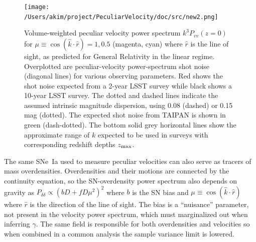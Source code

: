\documentclass[11pt, oneside]{article}   	%
\begin{document}
\begin{figure}[h]
\centering
\texttt{[image: /Users/akim/project/PeculiarVelocity/doc/src/new2.png]}
\caption{Volume-weighted peculiar velocity power spectrum $k^3P_{vv}(z=0)$ for $\mu \equiv \cos{(\hat{k} \cdot \hat{r})}=1, 0.5$ (magenta, cyan) 
where $\hat{r}$ is the line of sight, as predicted for General Relativity in the linear regime.
Overplotted are peculiar-velocity power-spectrum shot noise  (diagonal lines) for various observing parameters.  Red shows the shot noise expected from a 2-year LSST survey
while black shows a 10-year LSST survey.  The dotted and dashed lines indicate the assumed intrinsic magnitude dispersion, using 0.08 (dashed) or 0.15 mag (dotted).  The expected shot
noise from TAIPAN is shown in green (dash-dotted). 
%
The bottom solid grey horizontal lines show the approximate range of $k$ expected to be used in surveys with corresponding
redshift depths $z_{\rm max}$.
\label{power:fig}}
\end{figure}

The same SNe~Ia used  to measure peculiar velocities can also serve as tracers of mass overdensities.  Overdensities and their motions are connected by the
continuity equation, so the SN-overdensity power spectrum also depends on gravity 
as $P_{\delta \delta }\propto (bD + fD\mu^2)^2$ where $b$ is the SN bias and $\mu\equiv \cos{(\hat{k} \cdot \hat{r})}$ where $\hat{r}$ is the direction of
the line of sight.  
The bias is a ``nuisance'' parameter, not present in the velocity power spectrum, which must marginalized out when inferring $\gamma$.
The same field is responsible for both overdensities and velocities so when combined in a common analysis the sample variance limit is lowered.
\end{document}
